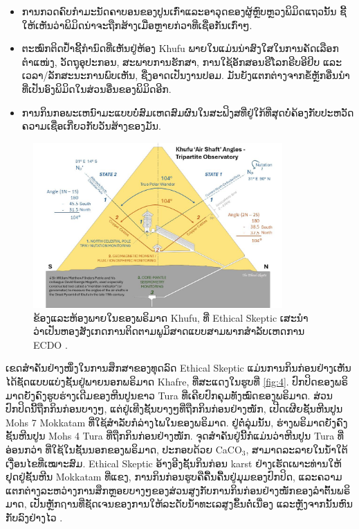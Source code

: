 \documentclass[10pt,twocolumn,letterpaper]{article}
\begin{document}
\begin{flushleft}
\begin{itemize}
    \item ການກວດຄົບກຳມະນັດຄາບອນຂອງປູນເກົ່າແລະອາວຸດຂອງຜູ້ຫຼົບຫຼວງພິມິດແຖວນັ້ນ ຊີ້ໃຫ້ເຫັນວ່າພິມິດນ່າຈະຖືກສ້າງເມື່ອຫຼາຍກ່ວາທີ່ເຊື່ອກັນເກົ່າໆ.
    \item ຕະໝົກຕິດປ້ຳຊີ້ກຳນົດທີ່ເຫັນຢູ່ຫ້ອງ Khufu ພາຍໃນແມ່ນນ່າສົງໃສໃນການຄັດເລືອກຕຳແໜ່ງ, ວັດຖຸອຸປະກອນ, ສະພາບການຮັກສາ, ການໃຊ້ອັກສອນຮີໂລກຣີບອີຢິບ ແລະເວລາ/ລັກສະນະການພົບເຫັນ, ຊື່ງອາດເປັນງານປອມ. ມັນຍັງແຕກຕ່າງຈາກຂໍ້ຫຼັກອື່ນນຳທີ່ເປັນອົງພິມິດໃນສ່ວນອື່ນຂອງພິມິດອີກ.
    \item ການກິນກອພະເຫນົາມະແບບບໍ່ສົມເຫດສົມຜົນໃນສະຟິງສທີ່ຢູ່ໃກ້ທີ່ສຸດບໍ່ຄ້ອງກັບປະຫວັດຄວາມເຊື່ອເກີ່ຍວກັບວັນສ້າງຂອງມັນ.
\end{itemize}
\end{flushleft}

\begin{figure}[b]
\begin{center}
\includegraphics[width=0.85\textwidth]{shafts.jpg}
\end{center}
   \caption{ຂ້ອງແລະຫ້ອງພາຍໃນຂອງພຣິມາດ Khufu, ທີ່ Ethical Skeptic ເສະນໍາວ່າເປັນຫອງສັງເກດການຕິດຕາມພູມິສາດແບບສາມພາກສໍາລັບເຫດການ ECDO \cite{28}.}
\label{fig:5}
\end{figure}

ເຂດສໍາຄັນຢ່າງໜຶ່ງໃນການສຶກສາຂອງທຸດລົດ Ethical Skeptic ແມ່ນການກິນກ່ອນຢ່າງເຫັນໄດ້ຊັດແບບແບ່ງຊັ້ນຢູ່ພາຍນອກພຣິມາດ Khafre, ທີ່ສະແດງໃນຮູບທີ່ \ref{fig:4}. ປົກປິດຂອງພຣິມາດຍັງຄົງຮູບຮ່າງເດີມຂອງຫີນປູນຂາວ Tura ທີ່ເຄີຍປົກຄຸມທັງໝົດຂອງພຣິມາດ. ສ່ວນປົກປິດນີ້ຖືກກິນກ່ອນບາງໆ, ແຕ່ຢູ່ເທີງຊັ້ນບາງໆທີ່ຖືກກິນກ່ອນຢ່າງໜັກ, ເປີດເຜີຍຊັ້ນຫີນປູນ Mohs 7 Mokkatam ທີ່ໃຊ້ສໍາລັບກໍລ່າງໄພໃນຂອງພຣິມາດ. ຢູ່ຕໍ່ລຸ່ມນັ້ນ, ຮ່າງພຣິມາດຍັງຄົງຊັ້ນຫີນປູນ Mohs 4 Tura ທີ່ຖືກກິນກ່ອນຢ່າງໜັກ. ຈຸດສຳຄັນຢູ່ນີ້ກໍແມ່ນວ່າຫີນປູນ Tura ທີ່ອ່ອນກວ່າ ທີ່ໃຊ້ໃນຊັ້ນນອກຂອງພຣິມາດ, ປະກອບດ້ວຍ CaCO$_3$, ສາມາດລະລາຍໃນນໍ້າໃຕ້ເງື່ອນໄຂທີ່ເໝາະສົມ. Ethical Skeptic ອ້າງອີງຊັ້ນກິນກ່ອນ karst ຢ່າງເຮັດເພາະທ່ານໃຫ້ຢຸດຢູ່ຊັ້ນຫີນ Mokkatam ທີ່ແຂງ, ການກິນກ່ອນຮູບຄືຄື້ນຄື້ນຢູ່ມຸມຂອງປົກປິດ, ແລະຄວາມແຕກຕ່າງລະຫວ່າງການສຶກຫຼອຍບາງໆຂອງສ່ວນສູງກັບການກິນກ່ອນຢ່າງໜັກຂອງລຳຕົ້ນພຣິມາດ, ເປັນຫຼັກຐານທີ່ຊັດເຈນຂອງການໃຫ້ລະດັບນ້ຳທະເລສູງຂຶ້ນຕໍ່ເນື່ອງ ແລະຫຼັງຈາກນັ້ນຫົນກັບລົງຢ່າງໄວ \cite{27}.
\end{document}
